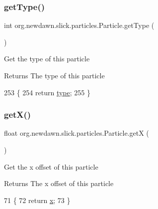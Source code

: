 \subsubsection{\texorpdfstring{get\+Type()}{getType()}}
{\footnotesize\ttfamily int org.\+newdawn.\+slick.\+particles.\+Particle.\+get\+Type (\begin{DoxyParamCaption}{ }\end{DoxyParamCaption})\hspace{0.3cm}{\ttfamily [inline]}}

Get the type of this particle

\begin{DoxyReturn}{Returns}
The type of this particle 
\end{DoxyReturn}

\begin{DoxyCode}
253                          \{
254         \textcolor{keywordflow}{return} \mbox{\hyperlink{classorg_1_1newdawn_1_1slick_1_1particles_1_1_particle_a8c228f79bbcb3a100f9b03ca98e29602}{type}};
255     \}
\end{DoxyCode}
\mbox{\label{classorg_1_1newdawn_1_1slick_1_1particles_1_1_particle_a5727ef74421d30a3161ebe84c62fd777}} 
\subsubsection{\texorpdfstring{get\+X()}{getX()}}
{\footnotesize\ttfamily float org.\+newdawn.\+slick.\+particles.\+Particle.\+getX (\begin{DoxyParamCaption}{ }\end{DoxyParamCaption})\hspace{0.3cm}{\ttfamily [inline]}}

Get the x offset of this particle

\begin{DoxyReturn}{Returns}
The x offset of this particle 
\end{DoxyReturn}

\begin{DoxyCode}
71                         \{
72         \textcolor{keywordflow}{return} \mbox{\hyperlink{classorg_1_1newdawn_1_1slick_1_1particles_1_1_particle_ae1ee7d5a72b34bbdb44110dfa2795674}{x}};
73     \}
\end{DoxyCode}
\mbox{\label{classorg_1_1newdawn_1_1slick_1_1particles_1_1_particle_a3d98bf8b855c83c16a4bbab74ce3041d}} 
